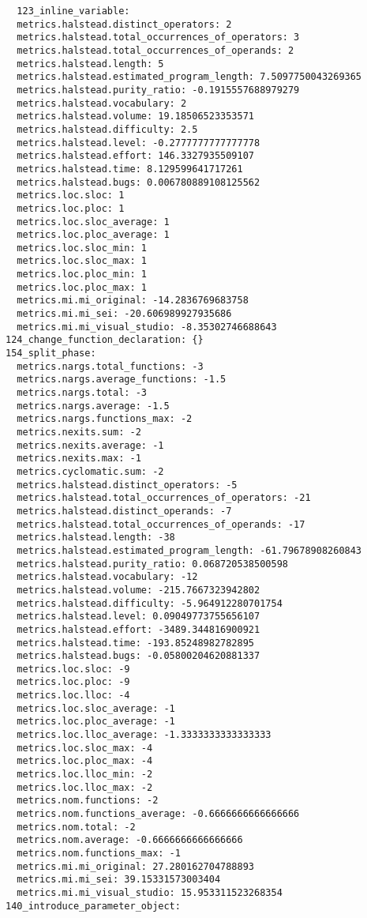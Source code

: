 \begin{verbatim}
  123_inline_variable:
  metrics.halstead.distinct_operators: 2
  metrics.halstead.total_occurrences_of_operators: 3
  metrics.halstead.total_occurrences_of_operands: 2
  metrics.halstead.length: 5
  metrics.halstead.estimated_program_length: 7.5097750043269365
  metrics.halstead.purity_ratio: -0.1915557688979279
  metrics.halstead.vocabulary: 2
  metrics.halstead.volume: 19.18506523353571
  metrics.halstead.difficulty: 2.5
  metrics.halstead.level: -0.2777777777777778
  metrics.halstead.effort: 146.3327935509107
  metrics.halstead.time: 8.129599641717261
  metrics.halstead.bugs: 0.006780889108125562
  metrics.loc.sloc: 1
  metrics.loc.ploc: 1
  metrics.loc.sloc_average: 1
  metrics.loc.ploc_average: 1
  metrics.loc.sloc_min: 1
  metrics.loc.sloc_max: 1
  metrics.loc.ploc_min: 1
  metrics.loc.ploc_max: 1
  metrics.mi.mi_original: -14.2836769683758
  metrics.mi.mi_sei: -20.606989927935686
  metrics.mi.mi_visual_studio: -8.35302746688643
124_change_function_declaration: {}
154_split_phase:
  metrics.nargs.total_functions: -3
  metrics.nargs.average_functions: -1.5
  metrics.nargs.total: -3
  metrics.nargs.average: -1.5
  metrics.nargs.functions_max: -2
  metrics.nexits.sum: -2
  metrics.nexits.average: -1
  metrics.nexits.max: -1
  metrics.cyclomatic.sum: -2
  metrics.halstead.distinct_operators: -5
  metrics.halstead.total_occurrences_of_operators: -21
  metrics.halstead.distinct_operands: -7
  metrics.halstead.total_occurrences_of_operands: -17
  metrics.halstead.length: -38
  metrics.halstead.estimated_program_length: -61.79678908260843
  metrics.halstead.purity_ratio: 0.068720538500598
  metrics.halstead.vocabulary: -12
  metrics.halstead.volume: -215.7667323942802
  metrics.halstead.difficulty: -5.964912280701754
  metrics.halstead.level: 0.09049773755656107
  metrics.halstead.effort: -3489.344816900921
  metrics.halstead.time: -193.85248982782895
  metrics.halstead.bugs: -0.05800204620881337
  metrics.loc.sloc: -9
  metrics.loc.ploc: -9
  metrics.loc.lloc: -4
  metrics.loc.sloc_average: -1
  metrics.loc.ploc_average: -1
  metrics.loc.lloc_average: -1.3333333333333333
  metrics.loc.sloc_max: -4
  metrics.loc.ploc_max: -4
  metrics.loc.lloc_min: -2
  metrics.loc.lloc_max: -2
  metrics.nom.functions: -2
  metrics.nom.functions_average: -0.6666666666666666
  metrics.nom.total: -2
  metrics.nom.average: -0.6666666666666666
  metrics.nom.functions_max: -1
  metrics.mi.mi_original: 27.280162704788893
  metrics.mi.mi_sei: 39.15331573003404
  metrics.mi.mi_visual_studio: 15.953311523268354
140_introduce_parameter_object:

\end{verbatim}
